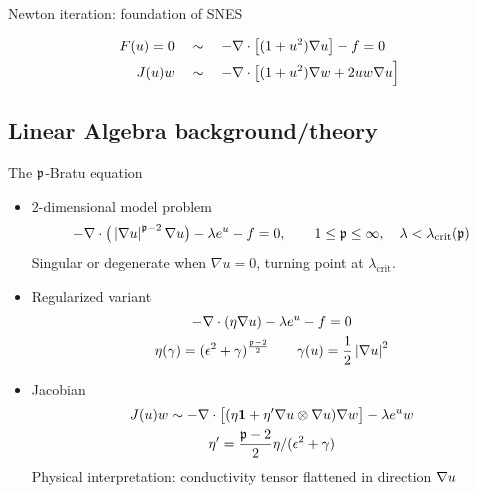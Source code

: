 \begin{frame}{Newton iteration: foundation of SNES}
\begin{example}
\begin{align*}
      F(u)=0 \quad &\sim\quad -\nabla \cdot \big[ (1+u^2) \nabla u \big] - f = 0 \\
      J(u)w \quad &\sim\quad  -\nabla \cdot \big[(1+u^2)\nabla w + 2uw\nabla u \Big]
    \end{align*}
  \end{example}
\end{frame}

\subsection{Linear Algebra background/theory}





\begin{frame}{The ${\mathfrak p}$-Bratu equation}
  \begin{itemize}
  \item 2-dimensional model problem
    \begin{equation*}
      -\nabla \cdot \big(\left\lvert \nabla u \right\rvert^{{\mathfrak p}-2} \nabla u \big) - \lambda e^u - f = 0, \qquad 1 \le {\mathfrak p} \le \infty, \quad \lambda < \lambda_{\text{crit}}({\mathfrak p})
    \end{equation*}
    Singular or degenerate when $\nabla u = 0$, turning point at $\lambda_{\text{crit}}$.
  \item Regularized variant
    \begin{gather*}
      -\nabla \cdot (\eta \nabla u) - \lambda e^u - f = 0 \\
      \eta(\gamma) = (\epsilon^2 + \gamma)^{\frac{{\mathfrak p}-2}{2}} \qquad \gamma(u) = {\frac 1 2} \left\lvert \nabla u \right\rvert^2
    \end{gather*}
  \item Jacobian
    \begin{gather*}
      J(u) w \sim -\nabla \cdot \big[ (\eta \bm 1 + \eta' \nabla u \otimes \nabla u) \nabla w \big] - \lambda e^u w \\
      \eta' = \frac{{\mathfrak p}-2}{2} \eta / (\epsilon^2 + \gamma)
    \end{gather*}
    Physical interpretation: conductivity tensor flattened in direction $\nabla u$ %
  \end{itemize}
\end{frame}

